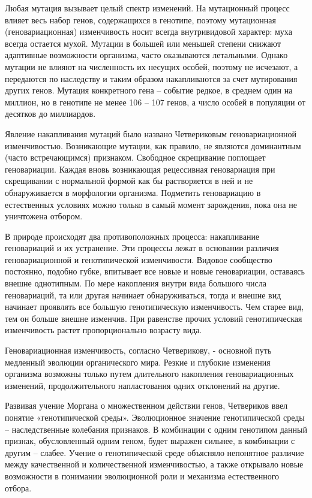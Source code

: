 \documentclass[exam_answers.tex]{subfiles}
\begin{document}
Любая мутация вызывает целый спектр изменений. На мутационный
процесс влияет весь набор генов, содержащихся в генотипе, поэтому
мутационная (геновариационная) изменчивость носит всегда внутривидовой
характер: муха всегда остается мухой. Мутации в большей или меньшей
степени снижают адаптивные возможности организма, часто оказываются
летальными. Однако мутации не влияют на численность их несущих особей,
поэтому не исчезают, а передаются по наследству и таким образом
накапливаются за счет мутирования других генов. Мутация конкретного гена –
событие редкое, в среднем один на миллион, но в генотипе не менее 106
– 107
генов, а число особей в популяции от десятков до миллиардов.

Явление накапливания мутаций было названо Четвериковым
геновариационной изменчивостью. Возникающие мутации, как правило, не
являются доминантным (часто встречающимся) признаком. Свободное
скрещивание поглощает геновариации. Каждая вновь возникающая
рецессивная геновариация при скрещивании с нормальной формой как бы
растворяется в ней и не обнаруживается в морфологии организма. Подметить
геновариацию в естественных условиях можно только в самый момент
зарождения, пока она не уничтожена отбором.

В природе происходят два противоположных процесса: накапливание
геновариаций и их устранение. Эти процессы лежат в основании различия
геновариационной и генотипической изменчивости. Видовое сообщество
постоянно, подобно губке, впитывает все новые и новые геновариации,
оставаясь внешне однотипным. По мере накопления внутри вида большого
числа геновариаций, та или другая начинает обнаруживаться, тогда и внешне
вид начинает проявлять все большую генотипическую изменчивость. Чем
старее вид, тем он больше внешне изменчив. При равенстве прочих условий
генотипическая изменчивость растет пропорционально возрасту вида. 

Геновариационная изменчивость, согласно Четверикову, - основной путь
медленный эволюции органического мира. Резкие и глубокие изменения
организма возможны только путем длительного накопления геновариационных
изменений, продолжительного напластования одних отклонений на другие.

Развивая учение Моргана о множественном действии генов, Четвериков
ввел понятие «генотипической среды». Эволюционное значение
генотипической среды – наследственные колебания признаков. В комбинации с
одним генотипом данный признак, обусловленный одним геном, будет
выражен сильнее, в комбинации с другим – слабее. Учение о генотипической
среде объясняло непонятное различие между качественной и количественной
изменчивостью, а также открывало новые возможности в понимании
эволюционной роли и механизма естественного отбора.
\end{document}
